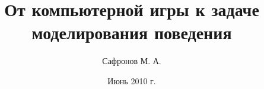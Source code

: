 \documentclass[a4paper]{report}
\title{От компьютерной игры к задаче моделирования поведения}
\author{Сафронов М. А.}
\date{Июнь 2010 г.}
\begin{document}
\begin{titlepage}
\maketitle
\end{titlepage}






\end{document}
